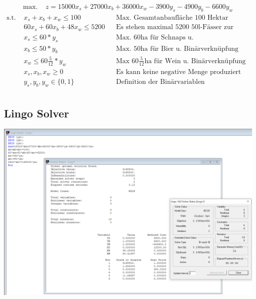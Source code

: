\documentclass[a4paper,11pt]{article}
\begin{document}
\begin{align*}
    \text{max. } & z = 15000x_{s} + 27000x_{b} + 36000x_{w} - 3900y_{s} - 4900y_{b} - 6600y_{w}
\end{align*}
\begin{align*}
    \text{s.t. } & x_{s} + x_{b} + x_{w} \le 100 && \text{Max. Gesamtanbaufläche 100 Hektar} \\
    & 60x_{s} + 60x_{b} + 48x_{w} \le 5200 && \text{Es stehen maximal 5200 50l-Fässer zur Verfügung} \\
    & x_{s} \le 60*y_{s} && \text{Max. 60ha für Schnaps u. Binärverknüpfung} \\
    & x_{b} \le 50*y_{b} && \text{Max. 50ha für Bier u. Binärverknüpfung} \\
    & x_{w} \le 60\frac{5}{12}*y_{w} && \text{Max $60\frac{5}{12}$ha für Wein u. Binärverknüpfung} \\
    & x_{s}, x_{b}, x_{w} \ge 0 && \text{Es kann keine negative Menge produziert werden} \\
    & y_{s}, y_{b}, y_{w} \in \{ 0,1 \} && \text{Definition der Binärvariablen} \\
\end{align*}

\subsection*{Lingo Solver}
\begin{centering}
	\includegraphics[width=1\linewidth]{src/blatt_4_aufgabe_1_loesung_solver.PNG}
\end{centering}
\end{document}
